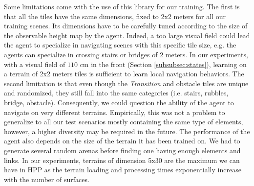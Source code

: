 Some limitations come with the use of this library for our training.
The first is that all the tiles have the same dimensions, fixed to 2x2 meters for all our training scenes. 
Its dimensions have to be carefully tuned according to the size of the observable height map by the agent.
Indeed, a too large visual field could lead the agent to specialize in navigating scenes with this specific tile size, e.g. the agents can specialize in crossing stairs or bridges of 2 meters. 
In our experiments, with a visual field of $110$ cm in the front (Section \ref{subsubsec:states}), learning on a terrain of 2x2 meters tiles is sufficient to learn local navigation behaviors.
The second limitation is that even though the \textit{Transition} and obstacle tiles are unique and randomized, they still fall into the same categories (i.e. stairs, rubbles, bridge, obstacle). Consequently, we could question the ability of the agent to navigate on very different terrains. Empirically, this was not a problem to generalize to all our test scenarios mostly containing the same type of elements, however, a higher diversity may be required in the future.
The performance of the agent also depends on the size of the terrain it has been trained on. We had to generate several random arenas before finding one having enough elements and links. 
In our experiments, terrains of dimension 5x30 are the maximum we can have in HPP as the terrain loading and processing times exponentially increase with the number of surfaces.

